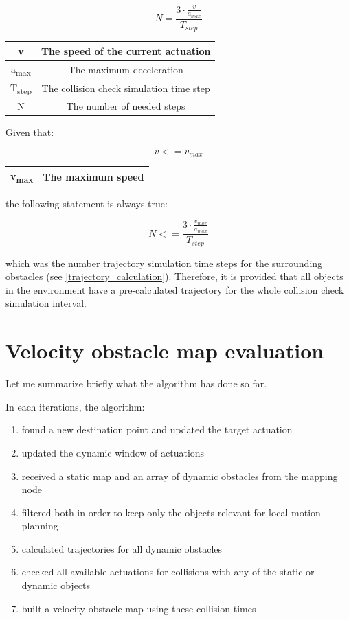 \[ N = \frac{3 \cdot \frac{v}{a_{max}}}{T_{step}} \]

\begin{center}
    \begin{tabular}{ | c | c | }
        \hline
        v						& The speed of the current actuation		\\
        \hline
        a\textsubscript{max}  	& The maximum deceleration      			\\
        \hline
        T\textsubscript{step}  	& The collision check simulation time step	\\
        \hline
        N  						& The number of needed steps				\\
        \hline
    \end{tabular}
\end{center}

Given that:

\[ v <= v_{max} \]

\begin{center}
    \begin{tabular}{ | c | c | }
        \hline
        v\textsubscript{max}	& The maximum speed		\\
        \hline
    \end{tabular}
\end{center}

the following statement is always true:

\[ N <= \frac{3 \cdot \frac{v_{max}}{a_{max}}}{T_{step}} \]

which was the number trajectory simulation time steps for the surrounding obstacles (see \ref{trajectory_calculation}). Therefore, it is provided that all objects in the environment have a pre-calculated trajectory for the whole collision check simulation interval.

\begin{minipage}{\textwidth}
\section{Velocity obstacle map evaluation}
\label{chap:velocity_obstacle_map_evaluation}
Let me summarize briefly what the algorithm has done so far.

In each iterations, the algorithm:
\begin{enumerate}
  \item found a new destination point and updated the target actuation
  \item updated the dynamic window of actuations
  \item received a static map and an array of dynamic obstacles from the mapping node
  \item filtered both in order to keep only the objects relevant for local motion planning
  \item calculated trajectories for all dynamic obstacles
  \item checked all available actuations for collisions with any of the static or dynamic objects
  \item built a velocity obstacle map using these collision times
\end{enumerate}
\end{minipage}

